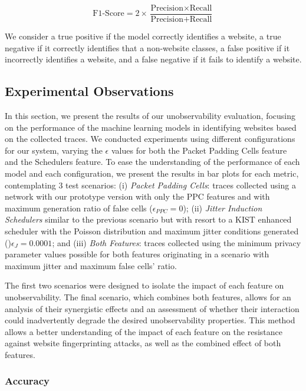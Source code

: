 \[
\text{F1-Score} = 2 \times \frac{\text{Precision} \times \text{Recall}}{\text{Precision} + \text{Recall}}
\]


We consider a true positive if the model correctly identifies a website, a true negative if it correctly identifies that a non-website classes, a false positive if it incorrectly identifies a website, and a false negative if it fails to identify a website. 

\subsection{Experimental Observations}\label{sec:experimental_observations_unobservability}

In this section, we present the results of our unobservability evaluation, focusing on the performance of the machine learning models in identifying websites based on the collected traces. We conducted experiments using different configurations for our system, varying the $\epsilon$ values for both the Packet Padding Cells feature and the Schedulers feature. To ease the understanding of the performance of each model and each configuration, we present the results in bar plots for each metric, contemplating 3 test scenarios: (i) \textit{Packet Padding Cells}: traces collected using a network with our prototype version with only the PPC features and with maximum generation ratio of false cells ($\epsilon_{PPC} = 0$); (ii) \textit{Jitter Induction Schedulers} similar to the previous scenario but with resort to a KIST enhanced scheduler with the Poisson distribution and maximum jitter conditions generated ()$\epsilon_{J} = 0.0001$; and (iii) \textit{Both Features}: traces collected using the minimum privacy parameter values possible for both features originating in a scenario with maximum jitter and maximum false cells' ratio. 

The first two scenarios were designed to isolate the impact of each feature on unobservability. The final scenario, which combines both features, allows for an analysis of their synergistic effects and an assessment of whether their interaction could inadvertently degrade the desired unobservability properties.
This method allows a better understanding of the impact of each feature on the resistance against website fingerprinting attacks, as well as the combined effect of both features.

\subsubsection{Accuracy}

